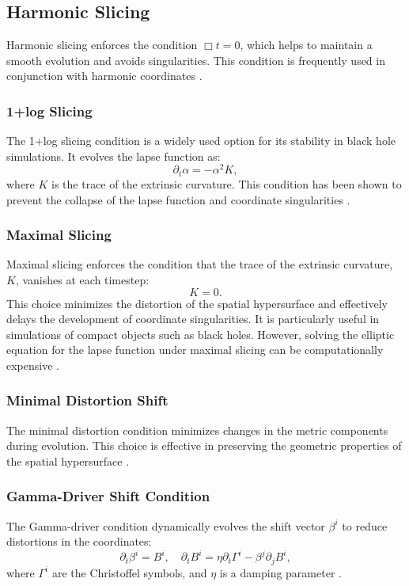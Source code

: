 \documentclass[12pt]{article}
\begin{document}
\subsection{Harmonic Slicing}
Harmonic slicing enforces the condition $\Box t = 0$, which helps to maintain a smooth evolution and avoids singularities. This condition is frequently used in conjunction with harmonic coordinates \cite{bona1994gauge}.

\subsubsection{1+log Slicing}
The 1+log slicing condition is a widely used option for its stability in black hole simulations. It evolves the lapse function as:
\[
\partial_t \alpha = -\alpha^2 K,
\]
where $K$ is the trace of the extrinsic curvature. This condition has been shown to prevent the collapse of the lapse function and coordinate singularities \cite{alcubierre2000standard}.

\subsubsection{Maximal Slicing}
Maximal slicing enforces the condition that the trace of the extrinsic curvature, $K$, vanishes at each timestep:
\[
K = 0.
\]
This choice minimizes the distortion of the spatial hypersurface and effectively delays the development of coordinate singularities. It is particularly useful in simulations of compact objects such as black holes. However, solving the elliptic equation for the lapse function under maximal slicing can be computationally expensive \cite{baumgarte2010numerical}.

\subsubsection{Minimal Distortion Shift}
The minimal distortion condition minimizes changes in the metric components during evolution. This choice is effective in preserving the geometric properties of the spatial hypersurface \cite{smarr1979structure}.

\subsubsection{Gamma-Driver Shift Condition}
The Gamma-driver condition dynamically evolves the shift vector $\beta^i$ to reduce distortions in the coordinates:
\[
\partial_t \beta^i = B^i, \quad \partial_t B^i = \eta \partial_t \Gamma^i - \beta^j \partial_j B^i,
\]
where $\Gamma^i$ are the Christoffel symbols, and $\eta$ is a damping parameter \cite{alcubierre2003gauge}.
\end{document}
